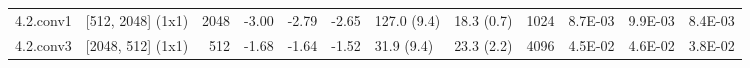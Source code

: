 \begin{table}
\begin{tabular}{llrrrrllrrrr}
4.2.conv1 & [512, 2048] (1x1) & 2048 & {\cellcolor[HTML]{FFF8B4}} \color[HTML]{000000} -3.00 & {\cellcolor[HTML]{FFFAB6}} \color[HTML]{000000} -2.79 & {\cellcolor[HTML]{FFFBB8}} \color[HTML]{000000} -2.65 & 127.0 (9.4) & 18.3 (0.7) & 1024 & {\cellcolor[HTML]{B9E176}} \color[HTML]{000000} 8.7E-03 & {\cellcolor[HTML]{C1E57B}} \color[HTML]{000000} 9.9E-03 & {\cellcolor[HTML]{B7E075}} \color[HTML]{000000} 8.4E-03 \\
4.2.conv3 & [2048, 512] (1x1) & 512 & {\cellcolor[HTML]{FAFDB8}} \color[HTML]{000000} -1.68 & {\cellcolor[HTML]{FAFDB8}} \color[HTML]{000000} -1.64 & {\cellcolor[HTML]{F8FCB6}} \color[HTML]{000000} -1.52 & 31.9 (9.4) & 23.3 (2.2) & 4096 & {\cellcolor[HTML]{F99355}} \color[HTML]{000000} 4.5E-02 & {\cellcolor[HTML]{F88C51}} \color[HTML]{F1F1F1} 4.6E-02 & {\cellcolor[HTML]{FDC372}} \color[HTML]{000000} 3.8E-02 \\
\bottomrule
\end{tabular}
\end{table}
